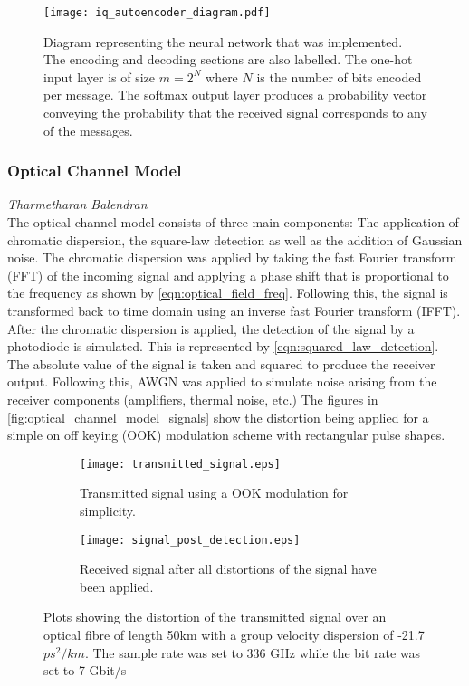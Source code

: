         \begin{figure}[H]
    		\centering
    		\texttt{[image: iq\_autoencoder\_diagram.pdf]}
    		\caption{Diagram representing the neural network that was implemented. The encoding and decoding sections are also labelled. The one-hot input layer is of size $m=2^N$ where $N$ is the number of bits encoded per message. The softmax output layer produces a probability vector conveying the probability that the received signal corresponds to any of the messages.}
    		\label{fig:iq_autoencoder_diagram}	
    	\end{figure}
    
    \subsubsection{Optical Channel Model}
    \label{sec:optical_channel_model}
    \hspace*{0pt}\hfill \textit{Tharmetharan Balendran}\\
    
        The optical channel model consists of three main components: The application of chromatic dispersion, the square-law detection as well as the addition of Gaussian noise. The chromatic dispersion was applied by taking the fast Fourier transform (FFT) of the incoming signal and applying a phase shift that is proportional to the frequency as shown by \autoref{eqn:optical_field_freq}. Following this, the signal is transformed back to time domain using an inverse fast Fourier transform (IFFT). After the chromatic dispersion is applied, the detection of the signal by a photodiode is simulated. This is represented by \autoref{eqn:squared_law_detection}. The absolute value of the signal is taken and squared to produce the receiver output. Following this, AWGN was applied to simulate noise arising from the receiver components (amplifiers, thermal noise, etc.) The figures in \autoref{fig:optical_channel_model_signals} show the distortion being applied for a simple on off keying (OOK) modulation scheme with rectangular pulse shapes. 
        
        \begin{figure}[H]
    		\begin{subfigure}{0.5\textwidth}
    			\centering
    			\texttt{[image: transmitted\_signal.eps]}
    			\caption{Transmitted signal using a OOK modulation for simplicity.}
    			\label{fig:transmitted_signal}	
    		\end{subfigure}
    		\begin{subfigure}{0.5\textwidth}
    			\centering
    			\texttt{[image: signal\_post\_detection.eps]}
    			\caption{Received signal after all distortions of the signal have been applied.}
    			\label{fig:signal_post_detection}	
    		\end{subfigure}
    		\caption{Plots showing the distortion of the transmitted signal over an optical fibre of length 50km with a group velocity dispersion of -21.7 $ps^2/km$. The sample rate was set to 336 GHz while the bit rate was set to 7 Gbit/s}
    		\label{fig:optical_channel_model_signals}
    	\end{figure}
    
